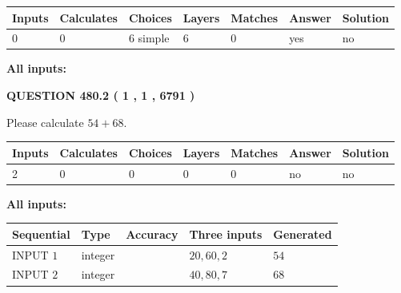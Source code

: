 \documentclass[12pt]{article}
\begin{document}
 
\noindent{}
 
 
   
   
   
   
\noindent\begin{tabular}{|l|l|l|l|l|l|l|}
 \hline
Inputs & Calculates & Choices & Layers & Matches & Answer & Solution \\ \hline
 0  & 
 0  & 
 6
  simple  
  & 
 6  & 
 0  & 
  yes & 
  no 
  \\ \hline
 \end{tabular}
   
   
   
   
\noindent{}
   
   
   
   
\noindent\vspace{0.1in}\hspace{-0.08in} {\textbf{\Large{All inputs: }}}
   
   
  
\vspace{0.2in}
  
{\textbf{\Large{QUESTION
480.2 
 ( 1 , 1 , 6791 )
}}}
  
  
 
Please calculate $ %
54 +  %
68 $.
 
 
   
   
   
   
\noindent\begin{tabular}{|l|l|l|l|l|l|l|}
 \hline
Inputs & Calculates & Choices & Layers & Matches & Answer & Solution \\ \hline
 2  & 
 0  & 
 0
  & 
 0  & 
 0  & 
  no & 
  no 
  \\ \hline
 \end{tabular}
   
   
   
   
\noindent{}
   
   
   
   
\noindent\vspace{0.1in}\hspace{-0.08in} {\textbf{\Large{All inputs: }}}
   
   
  
  
\noindent\begin{tabular}{|l|l|l|l|l|}
\hline
 Sequential & Type & Accuracy & Three inputs & Generated \\ 
\hline
 
 
  INPUT $  1 $ & integer &  & $
 20
 , 
 60
 , 
 2
 $ & $ 54 $ 
 \\  \hline  
 
 
  INPUT $  2 $ & integer &  & $
 40
 , 
 80
 , 
 7
 $ & $ 68 $ 
 \\  \hline  
 \end{tabular}
   
\end{document}
